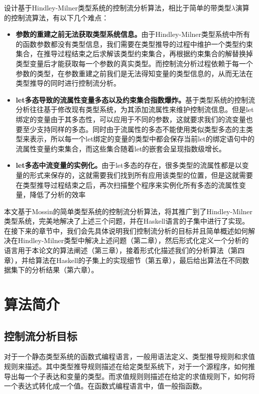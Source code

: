 \documentclass[UTF8, colorlinks]{pkuthss}
\begin{document}
	设计基于Hindley-Milner类型系统的控制流分析算法，相比于简单的带类型$\lambda$演算的控制流算法，有以下几个难点：
	\begin{itemize}
		\item \textbf{参数的重建之前无法获取类型系统信息。}由于Hindley-Milner类型系统中所有的函数参数都没有类型信息，我们需要在类型推导的过程中维护一个类型约束集合，在推导过程结束之后求解该类型约束集合，再根据约束集合的解替换掉类型变量后才能获取每一个参数的真实类型。而控制流分析过程依赖于每一个参数的类型，在参数重建之前我们是无法得知变量的类型信息的，从而无法在类型推导的同时进行控制流分析。
		\item \textbf{let多态导致的流属性变量多态以及约束集合指数爆炸。}基于类型系统的控制流分析往往基于修改现有类型系统，为其添加流属性来维护控制流信息。但是let绑定的变量由于其多态性，可以应用于不同的参数，这就要求我们的流变量也要至少支持同样的多态。同时由于流属性的多态不能使用类似类型多态的主类型来表示，所以每一个let绑定的变量的类型中都会保存当前let的绑定语句中的流属性变量约束集合，而这些集合随着let的嵌套会呈现指数级增长。
		\item \textbf{let多态中流变量的实例化。}由于let多态的存在，很多类型的流属性都是以变量的形式来保存的，这就需要我们找到所有应用该类型的位置，但是这就需要在类型推导过程结束之后，再次扫描整个程序来实例化所有多态的流属性变量，降低了分析的效率
	\end{itemize}
	
	本文基于Mossin的简单类型系统的控制流分析算法，将其推广到了Hindley-Milner类型系统，完美地解决了上述三个问题，并在Haskell语言的子集中进行了实现。 在接下来的章节中，我们会先具体说明我们控制流分析的目标并且简单概述如何解决在Hindley-Milner类型中解决上述问题（第二章），然后形式化定义一个分析的语言用于本论文的算法阐述（第三章），接着形式化描述我们的分析算法（第四章），并给算法在Haskell的子集上的实现细节（第五章），最后给出算法在不同数据集下的分析结果（第六章）。

	
	\chapter{算法简介}
	\section{控制流分析目标}
	对于一个静态类型系统的函数式编程语言，一般用语法定义、类型推导规则和求值规则来描述。其中类型推导规则描述在给定类型系统下，对于一个源程序，如何推导出每一个子表达和变量的类型。而求值规则则描述在给定的求值规则下，如何将一个表达式转化成一个值。在函数式编程语言中，值一般指函数。
	
\end{document}
